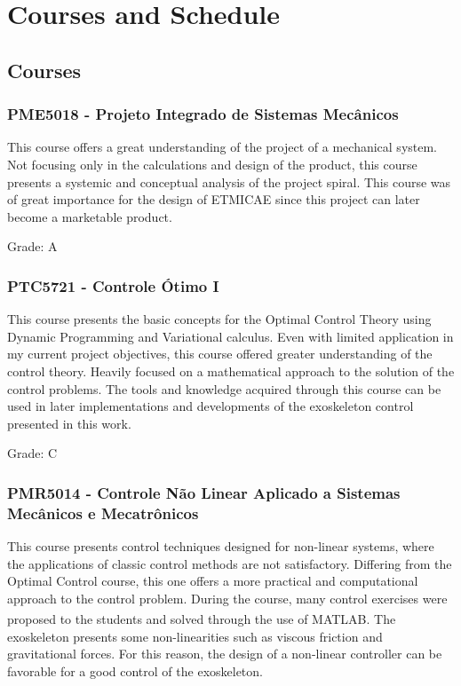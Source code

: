 \chapter{Courses and Schedule}

\section{Courses}

\subsection{PME5018 - Projeto Integrado de Sistemas Mecânicos}

This course offers a great understanding of the project of a mechanical system. Not focusing only in the calculations and design of the product, this course presents a systemic and conceptual analysis of the project spiral. This course was of great importance for the design of ETMICAE since this project can later become a marketable product.

Grade: A

\subsection{PTC5721 - Controle Ótimo I}

This course presents the basic concepts for the Optimal Control Theory using Dynamic Programming and Variational calculus. Even with limited application in my current project objectives, this course offered greater understanding of the control theory. Heavily focused on a mathematical approach to the solution of the control problems. The tools and knowledge acquired through this course can be used in later implementations and developments of the exoskeleton control presented in this work.

Grade: C

\subsection{PMR5014 - Controle Não Linear Aplicado a Sistemas \\ Mecânicos e Mecatrônicos}

This course presents control techniques designed for non-linear systems, where the applications of classic control methods are not satisfactory. Differing from the Optimal Control course, this one offers a more practical and computational approach to the control problem. During the course, many control exercises were proposed to the students and solved through the use of MATLAB\textsuperscript{\textregistered}.  The exoskeleton presents some non-linearities such as viscous friction and gravitational forces. For this reason, the design of a non-linear controller can be favorable for a good control of the exoskeleton. 

